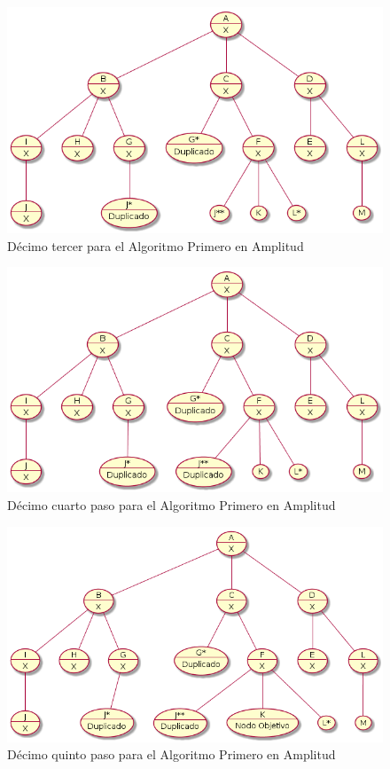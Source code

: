 \documentclass{article}
\begin{document}
\begin{figure}[H]
  \centering
  \includegraphics[width=.4\linewidth]{EJ4/ej4_012.png}
  \caption{D\'ecimo tercer para el Algoritmo Primero en Amplitud}
  \label{gr:g26}
\end{figure}

\begin{figure}[H]
  \centering
  \includegraphics[width=.4\linewidth]{EJ4/ej4_013.png}
  \caption{D\'ecimo cuarto paso para el Algoritmo Primero en Amplitud}
  \label{gr:g27}
\end{figure}

\begin{figure}[H]
  \centering
  \includegraphics[width=.4\linewidth]{EJ4/ej4_014.png}
  \caption{D\'ecimo quinto paso para el Algoritmo Primero en Amplitud}
  \label{gr:g28}
\end{figure}
\end{document}
